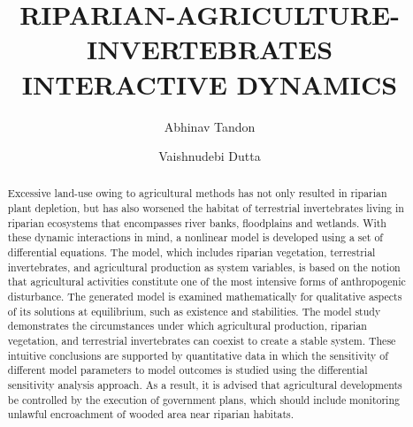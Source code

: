 \documentclass[12pt]{article}
\author[1]{Abhinav Tandon}
\author[2]{Vaishnudebi Dutta}
\affil[1]{Corresponding Author\thanks{abhinav.abhi02@gmail.com}}
\affil[1,2]{Birla Institute of Technology Mesra, Ranchi - 835215, Jharkhand, INDIA}
\title{RIPARIAN-AGRICULTURE-INVERTEBRATES INTERACTIVE DYNAMICS}
\numberwithin{equation}{section}
\begin{document}
\maketitle
\vspace{-1cm}
\begin{abstract}
Excessive land-use owing to agricultural methods has not only resulted in riparian plant depletion, but has also worsened the habitat of terrestrial invertebrates living in riparian ecosystems that encompasses river banks, floodplains and wetlands. With these dynamic interactions in mind, a nonlinear model is developed using a set of differential equations. The model, which includes riparian vegetation, terrestrial invertebrates, and agricultural production as system variables, is based on the notion that agricultural activities constitute one of the most intensive forms of anthropogenic disturbance. The generated model is examined mathematically for qualitative aspects of its solutions at equilibrium, such as existence and stabilities. The model study demonstrates the circumstances under which agricultural production, riparian vegetation, and terrestrial invertebrates can coexist to create a stable system. These intuitive conclusions are supported by quantitative data in which the sensitivity of different model parameters to model outcomes is studied using the differential sensitivity analysis approach. As a result, it is advised that agricultural developments be controlled by the execution of government plans, which should include monitoring unlawful encroachment of wooded area near riparian habitats.
\end{abstract}
\end{document}
